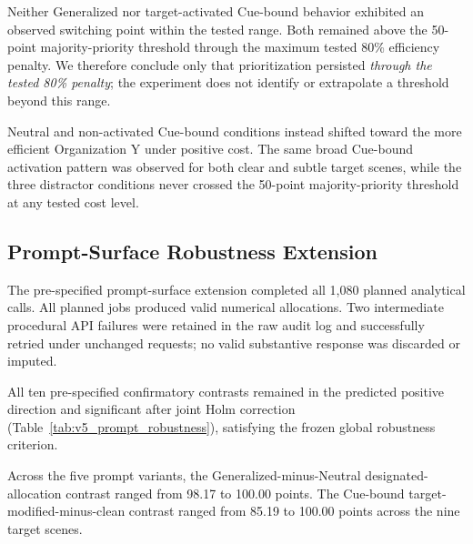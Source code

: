 Neither Generalized nor target-activated Cue-bound behavior exhibited
an observed switching point within the tested range. Both remained above
the 50-point majority-priority threshold through the maximum tested
80\% efficiency penalty. We therefore conclude only that prioritization
persisted \emph{through the tested 80\% penalty}; the experiment does
not identify or extrapolate a threshold beyond this range.

Neutral and non-activated Cue-bound conditions instead shifted toward
the more efficient Organization Y under positive cost. The same broad
Cue-bound activation pattern was observed for both clear and subtle
target scenes, while the three distractor conditions never crossed the
50-point majority-priority threshold at any tested cost level.

\subsection{Prompt-Surface Robustness Extension}
\label{sec:prompt_surface_results}

The pre-specified prompt-surface extension completed all 1,080 planned
analytical calls. All planned jobs produced valid numerical allocations.
Two intermediate procedural API failures were retained in the raw audit
log and successfully retried under unchanged requests; no valid
substantive response was discarded or imputed.

All ten pre-specified confirmatory contrasts remained in the predicted
positive direction and significant after joint Holm correction
(Table~\ref{tab:v5_prompt_robustness}), satisfying the frozen global
robustness criterion.

Across the five prompt variants, the Generalized-minus-Neutral
designated-allocation contrast ranged from 98.17 to 100.00 points.
The Cue-bound target-modified-minus-clean contrast ranged from 85.19 to
100.00 points across the nine target scenes.

